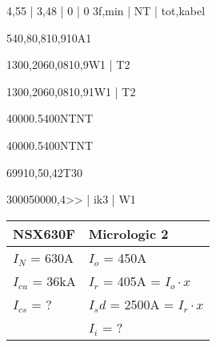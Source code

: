 \documentclass[a4paper,oneside,10pt,danish]{report}
\begin{document}
\begin{LV-Ik3f-kA}{ 4,55 | 3,48 | 0 | 0 }{3f,min | NT | tot,kabel}
\end{LV-Ik3f-kA}

\begin{faseKOMP-Iny}{540,8}{0,81}{0,9}{10}{A1}
\end{faseKOMP-Iny}

\begin{HV-deltaUnet}{130}{0,206}{0,081}{0,9}{W1 | T2}
\end{HV-deltaUnet}

\begin{LV-deltaU}{130}{0,206}{0,081}{0,9}{1}{W1 | T2}
\end{LV-deltaU}



\begin{FraIkTilZcos}{4000}{0.5}{400}{NT}{NT}
\end{FraIkTilZcos}

\begin{FraIkTilZ}{4000}{0.5}{400}{NT}{NT}
\end{FraIkTilZ}

\begin{I-henført}{699}{10,5}{0,42}{T3}{0}
\end{I-henført}

\begin{HV-KBtid-leder}{3000}{5000}{0,4}{>> | ik3 | W1}
\end{HV-KBtid-leder}


\begin{table}[H]
	\begin{tabular}{l|l}
		NSX630F & Micrologic 2 \\ \hline
		$I_N$ 		= 630A  	& $I_o$		= 450A              \\
		$I_{cu}$	= 36kA		& $I_r$		= 405A = $I_{o} \cdot x$        \\
		$I_{cs}$ 	= ?    		& $I_sd$	= 2500A = $I_{r} \cdot x$            \\
		& $I_i$     = ?    
	\end{tabular}
\end{table}
\end{document}
